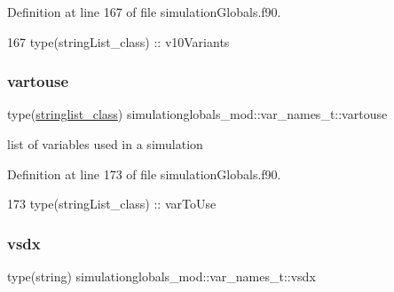 Definition at line 167 of file simulation\+Globals.\+f90.


\begin{DoxyCode}
167         \textcolor{keywordtype}{type}(stringList\_class) :: v10Variants
\end{DoxyCode}
\mbox{\label{structsimulationglobals__mod_1_1var__names__t_a53aa98ee01e1fa414c511cdc8066873c}} 
\subsubsection{\texorpdfstring{vartouse}{vartouse}}
{\footnotesize\ttfamily type(\mbox{\hyperlink{structsimulationglobals__mod_1_1stringlist__class}{stringlist\+\_\+class}}) simulationglobals\+\_\+mod\+::var\+\_\+names\+\_\+t\+::vartouse\hspace{0.3cm}{\ttfamily [private]}}



list of variables used in a simulation 



Definition at line 173 of file simulation\+Globals.\+f90.


\begin{DoxyCode}
173         \textcolor{keywordtype}{type}(stringList\_class) :: varToUse
\end{DoxyCode}
\mbox{\label{structsimulationglobals__mod_1_1var__names__t_a5fdad135513660f172a952e6b4cb4cba}} 
\subsubsection{\texorpdfstring{vsdx}{vsdx}}
{\footnotesize\ttfamily type(string) simulationglobals\+\_\+mod\+::var\+\_\+names\+\_\+t\+::vsdx\hspace{0.3cm}{\ttfamily [private]}}



